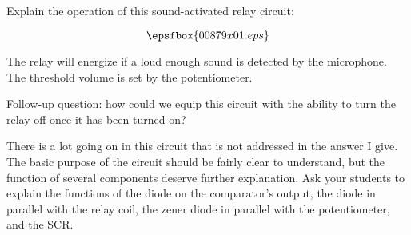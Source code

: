 

Explain the operation of this sound-activated relay circuit:

$$\epsfbox{00879x01.eps}$$







The relay will energize if a loud enough sound is detected by the microphone.  The threshold volume is set by the potentiometer.

\vskip 10pt

Follow-up question: how could we equip this circuit with the ability to turn the relay off once it has been turned on?







There is a lot going on in this circuit that is not addressed in the answer I give.  The basic purpose of the circuit should be fairly clear to understand, but the function of several components deserve further explanation.  Ask your students to explain the functions of the diode on the comparator's output, the diode in parallel with the relay coil, the zener diode in parallel with the potentiometer, and the SCR.




